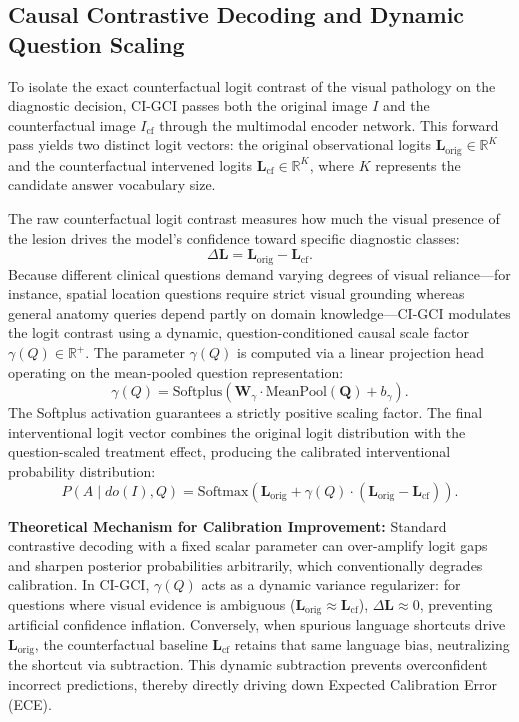 \documentclass[journal,twoside,web]{ieeecolor}
\begin{document}
\subsection{Causal Contrastive Decoding and Dynamic Question Scaling}
To isolate the exact counterfactual logit contrast of the visual pathology on the diagnostic decision, CI-GCI passes both the original image $I$ and the counterfactual image $I_{\text{cf}}$ through the multimodal encoder network. This forward pass yields two distinct logit vectors: the original observational logits $\mathbf{L}_{\text{orig}} \in \mathbb{R}^{K}$ and the counterfactual intervened logits $\mathbf{L}_{\text{cf}} \in \mathbb{R}^{K}$, where $K$ represents the candidate answer vocabulary size.

The raw counterfactual logit contrast measures how much the visual presence of the lesion drives the model's confidence toward specific diagnostic classes:
\begin{equation}
\Delta \mathbf{L} = \mathbf{L}_{\text{orig}} - \mathbf{L}_{\text{cf}}.
\label{eq:ite}
\end{equation}
Because different clinical questions demand varying degrees of visual reliance---for instance, spatial location questions require strict visual grounding whereas general anatomy queries depend partly on domain knowledge---CI-GCI modulates the logit contrast using a dynamic, question-conditioned causal scale factor $\gamma(Q) \in \mathbb{R}^{+}$. The parameter $\gamma(Q)$ is computed via a linear projection head operating on the mean-pooled question representation:
\begin{equation}
\gamma(Q) = \text{Softplus}\left(\mathbf{W}_{\gamma} \cdot \text{MeanPool}(\mathbf{Q}) + b_{\gamma}\right).
\label{eq:gamma_q}
\end{equation}
The Softplus activation guarantees a strictly positive scaling factor. The final interventional logit vector combines the original logit distribution with the question-scaled treatment effect, producing the calibrated interventional probability distribution:
\begin{equation}
P(A \mid do(I), Q) = \text{Softmax}\left(\mathbf{L}_{\text{orig}} + \gamma(Q) \cdot (\mathbf{L}_{\text{orig}} - \mathbf{L}_{\text{cf}})\right).
\label{eq:calibrated_prob}
\end{equation}

\noindent\textbf{Theoretical Mechanism for Calibration Improvement:} Standard contrastive decoding with a fixed scalar parameter can over-amplify logit gaps and sharpen posterior probabilities arbitrarily, which conventionally degrades calibration. In CI-GCI, $\gamma(Q)$ acts as a dynamic variance regularizer: for questions where visual evidence is ambiguous ($\mathbf{L}_{\text{orig}} \approx \mathbf{L}_{\text{cf}}$), $\Delta \mathbf{L} \approx 0$, preventing artificial confidence inflation. Conversely, when spurious language shortcuts drive $\mathbf{L}_{\text{orig}}$, the counterfactual baseline $\mathbf{L}_{\text{cf}}$ retains that same language bias, neutralizing the shortcut via subtraction. This dynamic subtraction prevents overconfident incorrect predictions, thereby directly driving down Expected Calibration Error (ECE).
\end{document}
